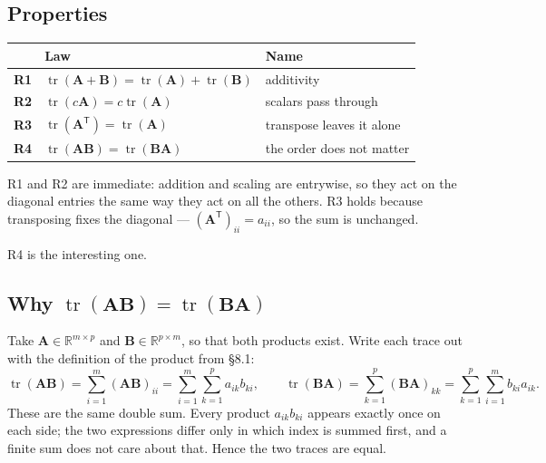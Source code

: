 \documentclass[11pt]{article}
\theoremstyle{plain}
\theoremstyle{definition}
\theoremstyle{remark}
\newcommand{\R}{\mathbb{R}}
\newcommand{\mt}[1]{\mathbf{#1}}        %
\newcommand{\T}{^{\mathsf{T}}}          %
\begin{document}
\subsection{Properties}
\begin{center}
\renewcommand{\arraystretch}{1.4}
\begin{tabular}{@{}l l l@{}}
\toprule
 & \textbf{Law} & \textbf{Name} \\
\midrule
\textbf{R1} & $\operatorname{tr}(\mt{A}+\mt{B})
              =\operatorname{tr}(\mt{A})+\operatorname{tr}(\mt{B})$
            & additivity \\
\textbf{R2} & $\operatorname{tr}(c\mt{A})=c\operatorname{tr}(\mt{A})$
            & scalars pass through \\
\textbf{R3} & $\operatorname{tr}(\mt{A}\T)=\operatorname{tr}(\mt{A})$
            & transpose leaves it alone \\
\textbf{R4} & $\operatorname{tr}(\mt{A}\mt{B})=\operatorname{tr}(\mt{B}\mt{A})$
            & the order does not matter \\
\bottomrule
\end{tabular}
\end{center}

\noindent R1 and R2 are immediate: addition and scaling are entrywise, so they
act on the diagonal entries the same way they act on all the others. R3 holds
because transposing fixes the diagonal --- $(\mt{A}\T)_{ii}=a_{ii}$, so the sum
is unchanged.

R4 is the interesting one.

\subsection{Why \texorpdfstring{$\operatorname{tr}(\mt{A}\mt{B})
            =\operatorname{tr}(\mt{B}\mt{A})$}{tr(AB) = tr(BA)}}
Take $\mt{A}\in\R^{m\times p}$ and $\mt{B}\in\R^{p\times m}$, so that both
products exist. Write each trace out with the definition of the product from
\S8.1:
\[
  \operatorname{tr}(\mt{A}\mt{B})
  =\sum_{i=1}^{m}(\mt{A}\mt{B})_{ii}
  =\sum_{i=1}^{m}\sum_{k=1}^{p} a_{ik}b_{ki},
  \qquad
  \operatorname{tr}(\mt{B}\mt{A})
  =\sum_{k=1}^{p}(\mt{B}\mt{A})_{kk}
  =\sum_{k=1}^{p}\sum_{i=1}^{m} b_{ki}a_{ik} .
\]
These are the same double sum. Every product $a_{ik}b_{ki}$ appears exactly once
on each side; the two expressions differ only in which index is summed first,
and a finite sum does not care about that. Hence the two traces are equal.
\end{document}
